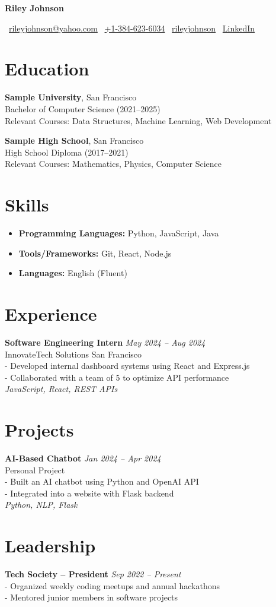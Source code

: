 \documentclass[10pt,a4paper]{article}
\newcommand{\name}[1]{\centerline{\Huge \bfseries #1}}
\newcommand{\contact}[4]{
    \begin{center}
        \small \faEnvelope~\href{mailto:#1}{#1} \quad
        \faPhone~\href{tel:#2}{#2} \quad
        \faGithub~\href{https://github.com/#3}{#3} \quad
        \faLinkedinSquare~\href{#4}{LinkedIn}
    \end{center}
}
\begin{document}
\name{Riley Johnson}
\contact{rileyjohnson@yahoo.com}{+1-384-623-6034}{rileyjohnson}{https://www.linkedin.com/in/rileyjohnson/}

\section*{Education}
\textbf{Sample University}, San Francisco \\
Bachelor of Computer Science (2021--2025) \\
Relevant Courses: Data Structures, Machine Learning, Web Development

\textbf{Sample High School}, San Francisco \\
High School Diploma (2017--2021) \\
Relevant Courses: Mathematics, Physics, Computer Science

\section*{Skills}
\begin{itemize}[leftmargin=1.5em, itemsep=0pt]
    \item \textbf{Programming Languages:} Python, JavaScript, Java
    \item \textbf{Tools/Frameworks:} Git, React, Node.js
    \item \textbf{Languages:} English (Fluent)
\end{itemize}

\section*{Experience}
\textbf{Software Engineering Intern} \hfill \textit{May 2024 -- Aug 2024} \\
InnovateTech Solutions \hfill San Francisco \\
- Developed internal dashboard systems using React and Express.js \\
- Collaborated with a team of 5 to optimize API performance \\
\textit{\footnotesize JavaScript, React, REST APIs}

\section*{Projects}
\textbf{AI-Based Chatbot} \hfill \textit{Jan 2024 -- Apr 2024} \\
Personal Project \\
- Built an AI chatbot using Python and OpenAI API \\
- Integrated into a website with Flask backend \\
\textit{\footnotesize Python, NLP, Flask}

\section*{Leadership}
\textbf{Tech Society -- President} \hfill \textit{Sep 2022 -- Present} \\
- Organized weekly coding meetups and annual hackathons \\
- Mentored junior members in software projects
\end{document}
